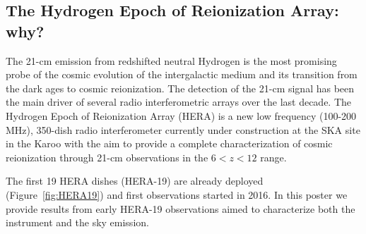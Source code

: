 \documentclass[a0,portrait]{a0poster}
\begin{document}

\begin{multicols}{2} %


\color{DarkSlateGray}

%
\section*{The Hydrogen Epoch of Reionization Array: why?}
The 21-cm emission from redshifted neutral Hydrogen is the most promising probe of the cosmic evolution of the intergalactic medium and its transition from the dark ages to cosmic reionization. The detection of the 21-cm signal has been the main driver of several radio interferometric arrays over the last decade. The Hydrogen Epoch of Reionization Array (HERA) is a new low frequency (100-200 MHz), 350-dish radio interferometer currently under construction at the SKA site in the Karoo with the aim to provide a complete characterization of cosmic reionization through 21-cm observations in the $6 < z < 12$ range. 

\noindent
The first 19 HERA dishes (HERA-19) are already deployed (Figure~\ref{fig:HERA19}) and first observations started in 2016. In this poster we provide results from early HERA-19 observations aimed to characterize both the instrument and the sky emission.


\end{multicols}
\end{document}
